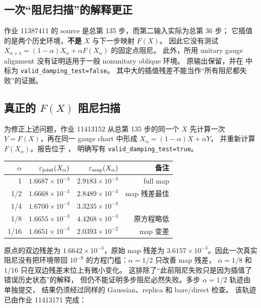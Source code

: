 \documentclass[11pt]{article}
\newcommand{\eps}{\varepsilon}
\newcommand{\code}[1]{{\small\texttt{#1}}}
\begin{document}
\subsection{一次“阻尼扫描”的解释更正}
作业 11387411 的 source 是总第 135 步，而第二输入实际为总第 36 步；
它插值的是两个历史环境，\textbf{不是} $X$ 与下一步映射 $F(X)$。
因此它没有测试 $X_{n+1}=(1-\alpha)X_n+\alpha F(X_n)$ 的固定点阻尼。
此外，所用 unitary gauge alignment 没有证明适用于一般 nonunitary oblique 环境。
原输出保留，并在
中标为 \code{valid\_damping\_test=false}。
其中大的插值残差不能当作“所有阻尼都失败”的证据。

\subsection{真正的 $F(X)$ 阻尼扫描}
为修正上述问题，作业 11413152 从总第 135 步的同一个 $X$ 先计算一次
$Y=F(X)$，再在同一 gauge chart 中形成 $X_\alpha=(1-\alpha)X+\alpha Y$，
并重新计算 $F(X_\alpha)$。报告位于
，
明确写有 \code{valid\_damping\_test=true}。
\begin{center}\small
\begin{tabular}{rrrr}
\toprule
$\alpha$ & $\eps_{\rm joint}(X_\alpha)$ & $\eps_{\rm map}(X_\alpha)$ & 备注\\
\midrule
1 & $1.6687\times10^{-3}$ & $2.9183\times10^{-3}$ & full map\\
1/2 & $1.6668\times10^{-3}$ & $2.8489\times10^{-3}$ & map 残差最佳\\
1/4 & $1.6700\times10^{-3}$ & $3.3235\times10^{-3}$ & \\
1/8 & $1.6655\times10^{-3}$ & $4.4268\times10^{-3}$ & 原方程略低\\
1/16 & $1.6651\times10^{-3}$ & $2.0393\times10^{-2}$ & map 变差\\
\bottomrule
\end{tabular}
\end{center}
原点的双边残差为 $1.6642\times10^{-3}$，原始 map 残差为
$3.6157\times10^{-3}$。因此一次真实阻尼没有把环境带回
$10^{-9}$ 的方程门槛：$\alpha=1/2$ 只改善 map 残差，
$\alpha=1/8$ 和 $1/16$ 只在双边残差末位上有微小变化。
这排除了“此前阻尼失败只是因为插值了错误历史状态”的解释，
但仍不能证明多步阻尼必然失败。多步 $\alpha=1/2$ 轨迹由
 单独提交，
结果仍须经过同样的 Gaussian、replica 和 bare/direct 检查。
该轨迹已由作业 11413171 完成：
\end{document}
